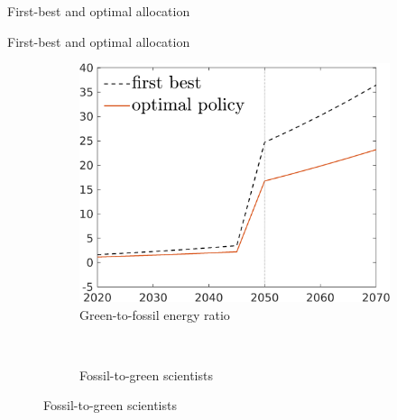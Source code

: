 \documentclass[11pt,aspectratio=169]{beamer}
\begin{document}
\begin{frame}{First-best and optimal allocation}
\begin{figure}[h!!]
\begin{subfigure}{0.45\textwidth}
		\end{subfigure}
	\end{figure}
		\vspace{7.7mm}
\end{frame}

\addtocounter{framenumber}{-1}
\begin{frame}{First-best and optimal allocation}
	\begin{figure}[h!!]
		\centering
		\begin{subfigure}{0.45\textwidth}		
			\caption{Green-to-fossil energy ratio}
			\includegraphics[width=1\textwidth]{../codding_model/own_basedOnFried/optimalPol_010922_revision/figures/all_13Sept22/NewCalib_effBauOpt_noBau_T_GFF_Sun2_emnet1_spillover0_knspil3_xgr0_nsk0_sep0_extern0_PV1_etaa0.79_lgd1.png}
		\end{subfigure}
		\begin{minipage}[]{0.05\textwidth}
			\
		\end{minipage}
		\begin{subfigure}{0.45\textwidth}		
			\caption{{Fossil-to-green scientists}}

\end{subfigure}
\end{figure}
\end{frame}
\end{document}
